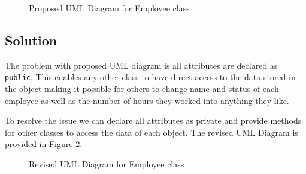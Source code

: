 \documentclass[12pt,letterpaper,twoside]{article}
\begin{document}
\begin{figure}[H]
	\centering
	\caption{Proposed UML Diagram for Employee class}\label{fig1}
\end{figure}

\newpage

\subsection*{Solution}

The problem with proposed UML diagram is all attributes are declared as \texttt{public}.
This enables any other class to have direct access to the data stored in the object making it possible for others to change name and status of each employee as well as the number of hours they worked into anything they like.

To resolve the issue we can declare all attributes as private and provide methods for other classes to access the data of each object.
The revised UML Diagram is provided in Figure \ref{fig2}.

\begin{figure}[H]
	\centering
	\caption{Revised UML Diagram for Employee class}\label{fig2}
\end{figure}
\end{document}
